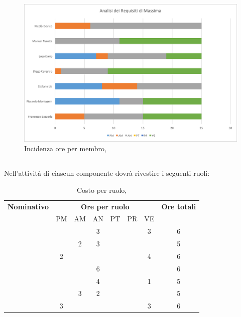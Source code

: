 \begin{figure}[H]
	\centering 
	\includegraphics[scale=0.55]{Immagini/GraficiPianoLavoro/ARM.png}
	\caption{Incidenza ore per membro, \ARM}
\end{figure}

\newpage
\subsection{\ARD}
Nell'attività di \ARD ciascun componente dovrà rivestire i seguenti ruoli:

\begin{table}[h]
	\begin{center}
		\begin{tabular}{|c|c|c|c|c|c|c|c|}
			\hline
			\textbf{Nominativo} & \multicolumn{6}{c|}{\textbf{Ore per ruolo}} & \textbf{Ore totali} \\
					& PM & AM & AN & PT & PR & VE & \\
			\hline
			\FB		& 	 &	  &	3  &	&	 & 3  &	6 \\
			\hline
			\RM		&	 & 2  &	3  &	&	 &	  &	5	\\
			\hline
			\SL		& 2	 &	  &	   &	&	 & 4  &	6	\\
			\hline
			\DC		&	 &	  &	6  &	&	 & 	  &	6	\\
			\hline
			\LD 	&	 &	  &	4  &	&	 & 1  &	5	\\
			\hline
			\MT		& 	 & 3  &	2  &	&	 &	  &	5	\\
			\hline
			\ND 	& 3	 &	  &	   &	&	 & 3  &	6	\\
			\hline
		\end{tabular}
	\end{center}
	\caption{Costo per ruolo, \ARD}
\end{table}

